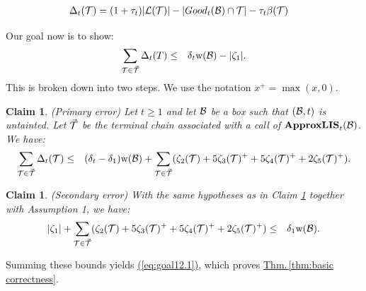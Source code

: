 \documentclass{acmsmall}
\newtheorem{claim}[theorem]{Claim}
\newcommand{\cB}{{\cal B}}
\newcommand{\cL}{{\cal L}}
\newcommand{\cT}{{\cal T}}
\newcommand{\Eqn}[1]{\hyperref[eq:#1]{(\ref*{eq:#1})}} %
\newcommand{\Thm}[1]{\hyperref[thm:#1]{Thm.\,\ref*{thm:#1}}} %
\newcommand{\width}{{\bf {\rm  w}}}
\newcommand{\errorterm}{\zeta}
\newcommand{\approxlis}{{\rm {\bf ApproxLIS}}}
\begin{document}
%
\begin{align} \label{eq:Delta}
\Delta_t(\cT) & = (1+\tau_t) |\cL(\cT)| -  |Good_t(\cB) \cap \cT | - \tau_t \beta(\cT) 
\end{align}

Our goal now is to show:
\begin{eqnarray}
\label{eq:goal12.1}
\sum_{\cT \in \vec{\cT}} \Delta_t(T) & \leq & \delta_t \width(\cB)-|\errorterm_1|.
\end{eqnarray}
%
This is broken down into two steps. We use the notation $x^+ = \max(x,0)$.

\begin{claim} \label{clm:primary} (Primary error)
Let $t \geq 1$ and let $\cB$ be a box such that $(\cB,t)$ is untainted.  Let $\vec{\cT}$ be the
terminal chain associated with a call of $\approxlis_t(\cB)$.  We have:
\begin{eqnarray}
\label{sum Delta}
\sum_{\cT \in \vec{\cT}} \Delta_t(\cT) & \leq & (\delta_t - \delta_1) \width(\cB)+\sum_{\cT \in \vec{\cT}}  (\errorterm_2(\cT) + 5 \errorterm_3(\cT)^+ + 5\errorterm_4(\cT)^+ + 2 \errorterm_5(\cT)^+).
\end{eqnarray}
\end{claim}

\begin{claim} \label{clm:secondary} (Secondary error)
%
With the same hypotheses as in Claim \ref{clm:primary} together with Assumption 1, we have:
\begin{eqnarray}
\label{goal 1.3}
|\errorterm_1|+\sum_{\cT \in \vec{\cT}} (\errorterm_2(\cT) + 5 \errorterm_3(\cT)^+ + 5\errorterm_4(\cT)^+ + 2 \errorterm_5(\cT)^+) & \leq & \delta_1\width(\cB).
\end{eqnarray}
\end{claim}
%

Summing these bounds yields \Eqn{goal12.1}, which proves \Thm{basic correctness}. 
\end{document}
